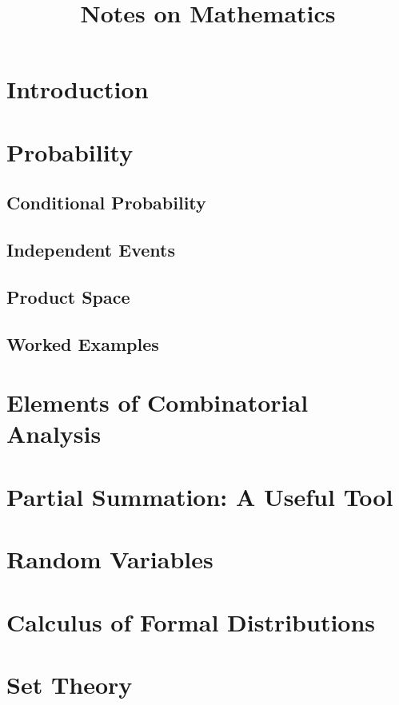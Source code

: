\documentclass{article}
\title{Notes on Mathematics}
\begin{document}
\maketitle
\tableofcontents

\section{Introduction}


\section{Probability}

\subsection{Conditional Probability}

\subsection{Independent Events}

\subsection{Product Space} 


\subsection{Worked Examples}


\section{Elements of Combinatorial Analysis}

\section[Partial Summation]{Partial Summation: A Useful Tool}


\section{Random Variables}


\section{Calculus of Formal Distributions}


\vfill\eject
\appendix
\section{Set Theory}


\end{document}
